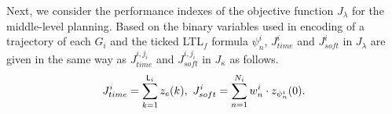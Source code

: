 \documentclass[journal,twoside,web]{IEEEtran}
\newcommand{\Len}{{\sf L}}
\newcommand{\G}[1]{\Box_{[#1]}}
\newcommand{\red}[1]{\textcolor{red}{#1}}
\begin{document}
Next, we consider the performance indexes of the objective function $J_\lambda$ for the middle-level planning.
Based on the binary variables used in encoding of a trajectory of each $G_{i}$ and the ticked LTL${}_f$ formula $\psi^{i}_n$, $J_{time}^i$ and $J_{soft}^i$ in $J_{\lambda}$ are given in the same way as $J_{time}^{i,j_i}$ and $J_{soft}^{i,j_i}$ in $J_{\kappa}$ as follows. 
\begin{align}\label{obj:2}
J_{time}^{i}=\sum_{k=1}^{\Len_{i}}z_e(k),~ J_{soft}^{i}=\sum_{n=1}^{N_{i}} w_{n}^{i}\cdot z_{\psi_{n}^{i}}(0).
\end{align}
%
\begin{comment}
Then, we consider $J_{lower}^i$ that indicates the sum of rewards of completed bottom-level plans.
One of candidates $\pi_{i,j_i}(J_\kappa)$ for $\kappa\in K$ can be selected when $z_{p_{i,{j_i}}}(k)=1$ for $j_i\in[1,~M_i]$. 
To represent which plan is selected at the $k$-th state of the trajectory of $G_i$, we introduce $\Len_i + 1$ binary variables $y_{p_{i,{j_i}},\kappa}(k)\in\{0,~1\}$ for $k\in[0,~\Len_i]$, $i\in[1,~M]$, $j_i\in[1,~M_i]$, and $\kappa\in K$.
Only if $p_{i,{j_i}}$ is true at the $k$-th state, i.e., $z_{p_{i,{j_i}}}(k)=1$, $y_{p_{i,{j_i}},\kappa}(k)=1$ that  represents that the bottom-level plan of $G_{i,{j_i}}$ determined by $\pi_{i,j_i}(J_\kappa)$ is selected at the $k$-th state.
To represent when and which bottom-level plan is \red{put into action}, we introduce $\Len_i + 1$ binary variables ${y}^{i,j_i}_{\kappa}$ as follows.
\begin{align}
y^{i,j_i}_{\kappa}
=\G{0,m_{\pi_{i,j_i}(J_\kappa)}} y_{p_{i,j_i},\kappa}.\label{hier2-1}
\end{align}
For each $k\in[0,~\Len_i]$, ${y}^{i,j_i}_{\kappa}(k)=1$ represents that the bottom-level plan determined by $\pi_{i,j_i}(J_\kappa)$ is \red{put into action} from the $k$-th state of $\pi_i(J_\lambda)$ until $m_{\pi_{i,j_i}(J_\kappa)}$ is passed.
Since each bottom-level TDES represents detailed behavior of a task(system?), e.x., a detailed procedure of an operation, one of candidates have to be completed for every stay at the states where refined atomic propositions are assigned.
Then, $y_{p_{i,{j_i}},\kappa}(k)$ satisfy the following equations.
\begin{align}\label{hier1}
\sum_{\kappa\in K}{y}_{p_{i,{j_i}},\kappa}(k) = z_{p_{i,{j_i}}}(k),~\mbox{for }\forall k\in[0,~\Len_i].
\end{align}
%

\end{comment}
\end{document}
